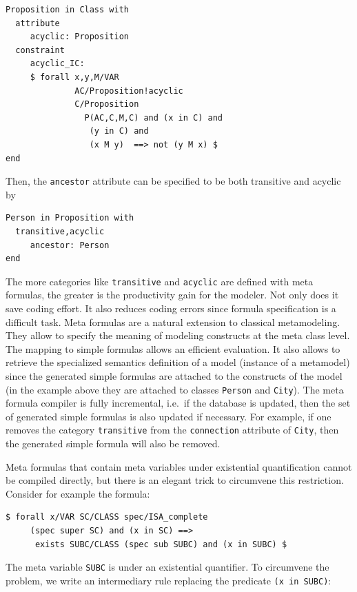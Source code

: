 \begin{verbatim}
Proposition in Class with
  attribute
     acyclic: Proposition
  constraint
     acyclic_IC: 
     $ forall x,y,M/VAR
              AC/Proposition!acyclic
              C/Proposition
                P(AC,C,M,C) and (x in C) and 
                 (y in C) and 
                 (x M y)  ==> not (y M x) $
end
\end{verbatim}

Then, the {\tt ancestor} attribute can be specified to be both transitive and acyclic by

\begin{verbatim}
Person in Proposition with
  transitive,acyclic
     ancestor: Person
end
\end{verbatim}

The more categories like {\tt transitive} and {\tt acyclic} are defined with meta formulas,
the greater is the productivity gain for the modeler. Not only does it save coding effort.
It also reduces coding errors since formula specification is a difficult task.
Meta formulas are a natural extension to classical metamodeling. They allow to specify the
meaning of modeling constructs at the meta class level. The mapping to simple formulas
allows an efficient evaluation. It also allows to retrieve the specialized semantics definition
of a model (instance of a metamodel) since the generated simple formulas are attached to
the constructs of the model (in the example above they are attached to classes {\tt Person}
and {\tt City}). The meta formula compiler is fully incremental, i.e.\ if the database
is updated, then the set of generated simple formulas is also updated if necessary. For example,
if one removes the category {\tt transitive} from the {\tt connection} attribute of {\tt City}, then
the generated simple formula will also be removed.

Meta formulas that contain meta variables under existential quantification cannot be compiled
directly, but there is an elegant trick to circumvene this restriction. Consider for example
the formula:

\begin{verbatim}
$ forall x/VAR SC/CLASS spec/ISA_complete 
     (spec super SC) and (x in SC) ==>
      exists SUBC/CLASS (spec sub SUBC) and (x in SUBC) $
\end{verbatim}

The meta variable {\tt SUBC} is under an existential quantifier. To circumvene the problem,
we write an intermediary rule replacing the predicate {\tt (x in SUBC)}:


